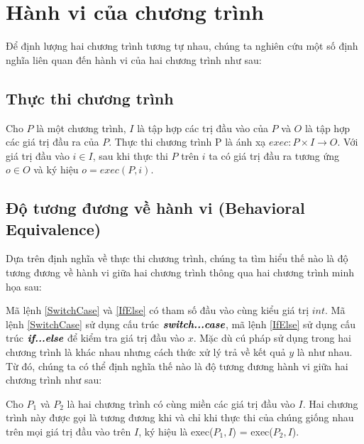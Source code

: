 \section{Hành vi của chương trình }
Để định lượng hai chương trình tương tự nhau, chúng ta nghiên cứu một số định nghĩa liên quan đến hành vi của hai chương trình như sau:
	
\subsection{Thực thi chương trình}
\begin{definition}\label{def:progexe}
Cho $P$ là một chương trình, $I$ là tập hợp các trị đầu vào của $P$ và $O$ là tập hợp các giá trị đầu ra của $P$. Thực thi chương trình P là ánh xạ $exec: P \times I \rightarrow O$. Với giá trị đầu vào $i \in I$, sau khi thực thi $P$ trên $i$ ta có giá trị đầu ra tương ứng $o \in O$ và ký hiệu $o = exec(P, i)$.  
\end{definition}

\subsection{Độ tương đương về hành vi (Behavioral Equivalence)}

Dựa trên định nghĩa về thực thi chương trình, chúng ta tìm hiểu thế nào là độ tương đương về hành vi giữa hai chương trình thông qua hai chương trình minh họa sau:

\begin{minipage}[t]{0.45\linewidth}
	
\end{minipage}%
\hfill\vrule\hfill
\begin{minipage}[t]{0.45\linewidth}
	
\end{minipage}%

Mã lệnh \ref{SwitchCase} và \ref{IfElse} có tham số đầu vào cùng kiểu giá trị $int$. Mã lệnh \ref{SwitchCase} sử dụng cấu trúc $\textit{\textbf{switch...case}}$, mã lệnh \ref{IfElse} sử dụng cấu trúc $\textit{\textbf{if...else}}$ để kiểm tra giá trị đầu vào $x$. Mặc dù cú pháp sử dụng trong hai chương trình là khác nhau nhưng cách thức xử lý trả về kết quả $y$ là như nhau. Từ đó, chúng ta có thể định nghĩa thế nào là độ tương đương hành vi giữa hai chương trình như sau:

\begin{definition}
 Cho $P_{1}$ và $P_{2}$ là hai chương trình có cùng miền các giá trị đầu vào $I$. Hai chương trình này được gọi là tương đương khi và chỉ khi thực thi của chúng giống nhau trên mọi giá trị đầu vào trên $I$, ký hiệu là exec($P_{1}, I$) = exec($P_{2}, I$). 
\end{definition}	
	
